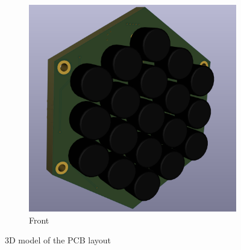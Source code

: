 \begin{figure}[ht]
\begin{subfigure}[b]{0.6\textwidth}
    \includegraphics[width=\textwidth]{src/assets/pictures/circuit/pcb_front.png}
    \caption{Front}
    \label{fig:pcb:front}
  \end{subfigure}
  \caption{3D model of the PCB layout}
  \label{fig:pcb}
\end{figure}
%